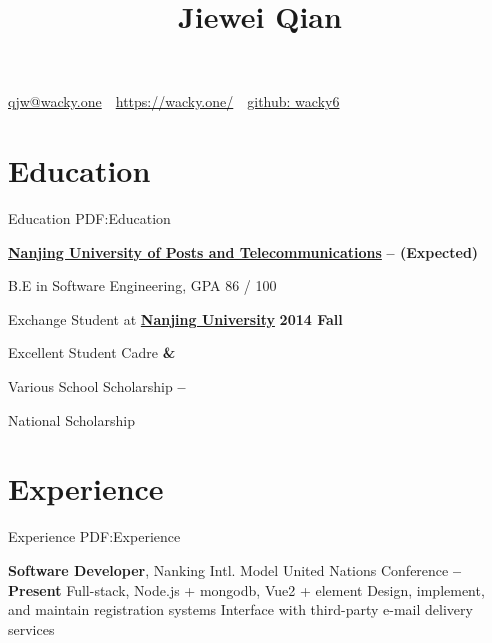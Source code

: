 \documentclass[a4paper,MMMyyyy,nonstop]{simpleresumecv}
\newcommand{\CVAuthor}{Jiewei Qian}
\newcommand{\CVWebpage}{https://wacky.one/}
\begin{document}
\thispagestyle{empty}


\title{\CVAuthor}

\begin{subtitle}
\par
\href{mailto:qjw@wacky.one}
{qjw@wacky.one}
\,\SubBulletSymbol\,
\href{\CVWebpage}
{\CVWebpage}
\,\SubBulletSymbol\,
\href{https://github.com/wacky6}
{github: wacky6}
\end{subtitle}

\begin{body}


\section
{Education}
{Education}
{PDF:Education}

\href{http://www.njupt.edu.cn/}
{\textbf{Nanjing University of Posts and Telecommunications}}
\hfill
\textbf{
     --
     (Expected)
}

\SubItem
B.E in Software Engineering, GPA 86 / 100

\SubItem
Exchange Student at \href{http://www.nju.edu.cn/}{\textbf{Nanjing University}}
\hfill
\textbf{
    2014 Fall
}

\SubItem
Excellent Student Cadre
\hfill
\textbf{
     \& 
}

\SubItem
Various School Scholarship
\hfill
\textbf{
     --  
}

\SubItem
National Scholarship
\hfill
\textbf{
}


\section
{Experience}
{Experience}
{PDF:Experience}

\textbf{Software Developer}, Nanking Intl. Model United Nations Conference
\hfill \textbf{
      -- Present
}
\SubItem
Full-stack, Node.js + mongodb, Vue2 + element
\SubItem
Design, implement, and maintain registration systems
\SubItem
Interface with third-party e-mail delivery services


\end{body}
\end{document}
